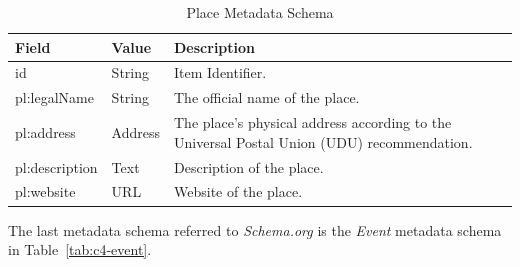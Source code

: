 \begin{longtable}{|p{}|p{}|p{}|}
    \caption{Place Metadata Schema} \label{tab:c4-place} \\
    \hline
    \textbf{Field} & \textbf{Value} & \textbf{Description} \\
    \hline

    \scriptsize id                      & \scriptsize String                                            &  \scriptsize Item Identifier. \\
    \hline
    \scriptsize pl:legalName             & \scriptsize String                                            &  \scriptsize The official name of the place. \\
    \hline
    \scriptsize pl:address               & \scriptsize Address                                          &  \scriptsize The place's physical address according to the Universal Postal Union (UDU) recommendation. \\
    \hline
    \scriptsize pl:description           & \scriptsize Text                                             &  \scriptsize Description of the place. \\
    \hline
    \scriptsize pl:website                 & \scriptsize URL                                              &  \scriptsize Website of the place. \\
    \hline

\end{longtable}

The last metadata schema referred to \textit{Schema.org} is the \textit{Event} metadata schema in Table~\ref{tab:c4-event}.

